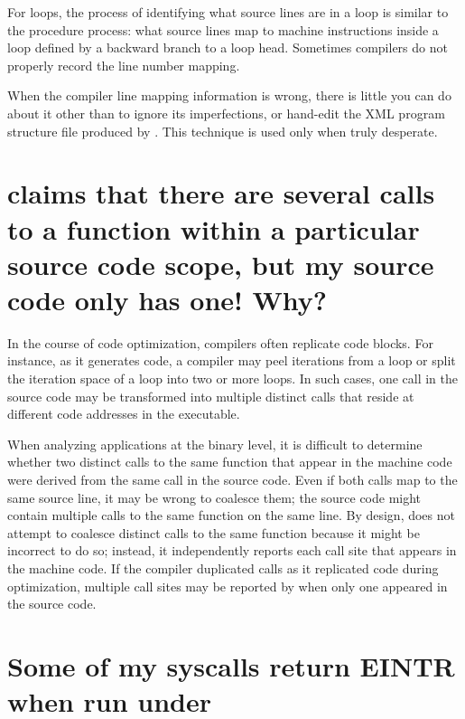 \documentclass[11pt,letterpaper]{report}
\begin{document}
For loops, the process of identifying what source lines are in a loop is similar to the procedure process: what source lines map to machine instructions inside a loop defined by a backward branch to a loop head.
Sometimes compilers do not properly record the line number mapping.

When the compiler line mapping information is wrong, there is little you can do about it other than to ignore its imperfections, or hand-edit the XML program structure file produced by \hpcstruct{}.
This technique is used only when truly desperate.



\section{\hpcviewer{} claims that there are several calls to a function within a particular source code scope, but my source code only has one!  Why?}

In the course of code optimization, compilers often replicate code blocks.
For instance, as it generates code, a compiler may peel iterations from a loop or split the iteration space of a loop into two or more loops.
In such cases, one call in the source code may be transformed into multiple distinct calls that reside at different code addresses in the executable.

When analyzing applications at the binary level, it is difficult to determine whether two distinct calls to the same function that appear in the machine code were derived from the same call in the source code.
Even if both calls map to the same source line, it may be wrong to coalesce them; the source code might contain multiple calls to the same function on the same line.
By design, \HPCToolkit{} does not attempt to coalesce distinct calls to the same function because it might be incorrect to do so; instead, it independently reports each call site that appears in the machine code.
If the compiler duplicated calls as it replicated code during optimization, multiple call sites may be reported by \hpcviewer{} when only one appeared in the source code.



\section{Some of my syscalls return EINTR when run under \hpcrun{}}
\end{document}
